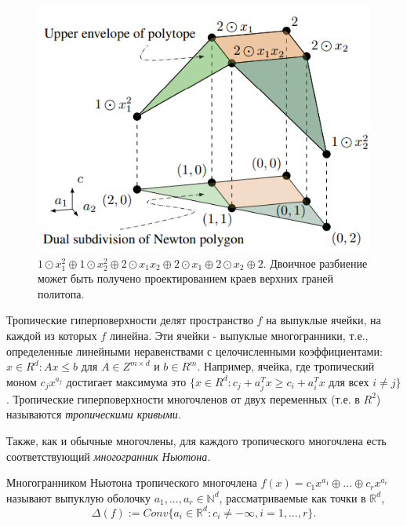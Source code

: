 \documentclass[russian]{lecture-notes}
\begin{document}
	\begin{figure}[h]
		\centering
		\includegraphics{dual_subdivision.png}
		\caption{$1 \odot x_1^2 \oplus 1 \odot x_2^2 \oplus 2 \odot x_1x_2 \oplus 2 \odot x_1 \oplus 2 \odot x_2 \oplus 2.$ Двоичное разбиение может быть получено проектированием краев верхних граней политопа.}
	\end{figure}
	
	Тропические гиперповерхности делят пространство $f$ на выпуклые ячейки, на каждой из которых $f$ линейна. Эти ячейки - выпуклые многогранники, т.е., определенные линейными неравенствами с целочисленными коэффициентами: ${x \in R^d : Ax \leq b}$ для $ A \in Z^{m \times d}$ и $b \in R^m$. Например, ячейка, где тропический моном $c_jx^{a_j}$ достигает максимума это $\{x \in R^d : c_j + a_j^Tx \geq c_i + a_i^Tx$ для всех $ i \neq j\}$. Тропические гиперповерхности многочленов от двух переменных (т.е. в $R^2$) называются \textit{тропическими кривыми}.
	
	Также, как и обычные многочлены, для каждого тропического многочлена есть соответствующий \textit{многогранник Ньютона}.
	
	\begin{Definition}
		Многогранником Ньютона тропического многочлена $f(x) = c_1x^{a_1} \oplus ... \oplus c_r x^{a_r}$ называют выпуклую оболочку $a_1, ..., a_r \in \mathbb{N}^d$, рассматриваемые как точки в $\mathbb{R}^d$,
		\begin{equation*}
		\Delta(f) := Conv\{a_i \in \mathbb{R}^d : c_i \neq - \infty, i=1,...,r\}.
		\end{equation*}
	\end{Definition}
	
\end{document}
